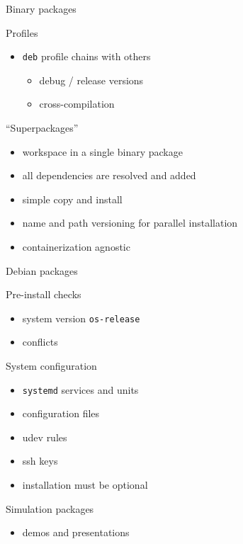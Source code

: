 \documentclass[hyperref={colorlinks=false, breaklinks=true},11pt]{beamer}
\begin{document}
\begin{frame}{Binary packages}
    \begin{block}{Profiles}
        \begin{itemize}
            \item \texttt{deb} profile chains with others
                \begin{itemize}
                    \item debug / release versions
                    \item cross-compilation
                \end{itemize}
        \end{itemize}
    \end{block}

    \begin{block}{``Superpackages''}
        \begin{itemize}
            \item workspace in a single binary package
            \item all dependencies are resolved and added
            \item simple copy and install
            \item name and path versioning for parallel installation
            \item containerization agnostic
        \end{itemize}
    \end{block}
\end{frame}

\begin{frame}{Debian packages}

    \begin{block}{Pre-install checks}
        \begin{itemize}
            \item system version \texttt{os-release}
            \item conflicts
        \end{itemize}
    \end{block}

    \begin{block}{System configuration}
        \begin{itemize}
            \item \texttt{systemd} services and units
            \item configuration files
            \item udev rules
            \item ssh keys
            \item installation must be optional
        \end{itemize}
    \end{block}

    \begin{block}{Simulation packages}
        \begin{itemize}
            \item demos and presentations
        \end{itemize}
    \end{block}
\end{frame}
\end{document}
